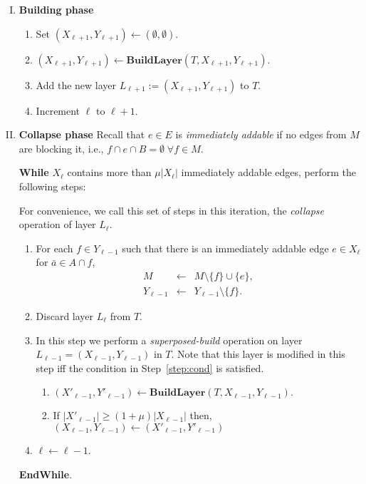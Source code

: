 \documentclass[11pt]{article}
\theoremstyle{definition}
\theoremstyle{remark}
\begin{document}
\begin{enumerate}[(I)]
\item \textbf{Building phase}

  \begin{enumerate}
  \item Set $(X_{\ell+1}, Y_{\ell+1}) \leftarrow (\emptyset,
    \emptyset)$.
  \item $(X_{\ell+1}, Y_{\ell+1}) \gets \textbf{BuildLayer}(T,
    X_{\ell+1}, Y_{\ell+1}).$
  \item Add the new layer $L_{\ell+1}:=(X_{\ell+1}, Y_{\ell+1})$ to
    $T$.
  \item Increment $\ell$ to $\ell+1$.
  \end{enumerate}

\item \textbf{Collapse phase} Recall that $e \in E$ is
  \textit{immediately addable} if no edges from $M$ are blocking it,
  i.e., $f \cap e \cap B = \emptyset \; \forall f \in
  M$.

    \textbf{While} $X_{\ell}$ contains more than $\mu|X_{\ell}|$
    immediately addable edges, perform the following steps:

    For convenience, we call this set of steps in this iteration, the
    \emph{collapse} operation of layer $L_{\ell}$.

    \begin{enumerate}
    \item\label{step:lazy1} For each $f \in Y_{\ell-1}$ such that there is an immediately
      addable edge $e \in X_{\ell}$ for $\bar{a} \in A \cap f$,
      \begin{eqnarray*} 
        M &\leftarrow& M \setminus \{f\} \cup \{e\}, \\
        Y_{\ell-1} &\leftarrow& Y_{\ell-1} \setminus \{f\}. 
      \end{eqnarray*}
    \item Discard layer $L_\ell$ from $T$.
    \item\label{step:simulate} In this step we perform a
      \emph{superposed-build} operation on layer
      $L_{\ell-1} = (X_{\ell-1}, Y_{\ell-1})$ in $T$. Note that this
      layer is modified in this step iff the condition in
      Step~\ref{step:cond} is satisfied.
      \begin{enumerate}
      \item
        $(X'_{\ell-1}, Y'_{\ell-1}) \gets \textbf{BuildLayer}(T,
        X_{\ell-1}, Y_{\ell-1}).$
      \item\label{step:cond} If
        $|X'_{\ell-1}| \geq (1 + \mu)|X_{\ell-1}|$ then,
        $(X_{\ell-1}, Y_{\ell-1}) \gets (X'_{\ell-1}, Y'_{\ell-1})$
      \end{enumerate}
    \item $\ell \leftarrow \ell-1$.
    \end{enumerate}
    \textbf{EndWhile}.
\end{enumerate}
\end{document}
